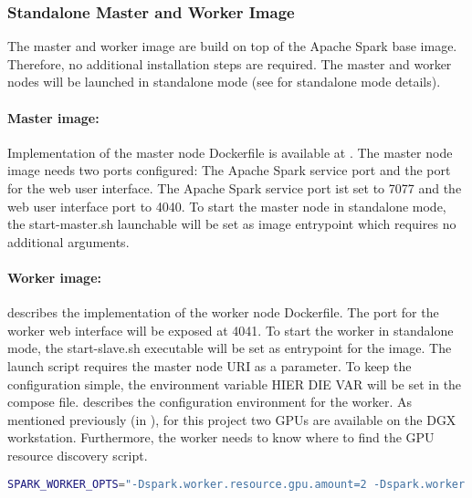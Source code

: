 \subsubsection{Standalone Master and Worker Image}
The master and worker image are build on top of the  Apache Spark base image.
Therefore, no additional installation steps are required.
The master and worker nodes will be launched in standalone mode (see  for standalone mode details).


\paragraph{Master image:}
Implementation of the master node Dockerfile is available at .
The master node image needs two ports configured: The Apache Spark service port and the port for the web user interface.
The Apache Spark service port ist set to 7077 and the web user interface port to 4040. 
To start the master node in standalone mode, the start-master.sh launchable will be set as image entrypoint which requires no additional arguments.


\paragraph{Worker image:}
 describes the implementation of the worker node Dockerfile.
The port for the worker web interface will be exposed at 4041.
To start the worker in standalone mode, the start-slave.sh executable will be set as entrypoint for the image.
The launch script requires the master node URI as a parameter. To keep the configuration simple, the environment variable HIER DIE VAR will be set in the compose file.
 describes the configuration environment for the worker. As mentioned previously (in ), for this project two GPUs are available on the DGX workstation. Furthermore, the worker needs to know where to find the GPU resource discovery script.

\begin{lstlisting}[label=lst:06_computing_spark_worker-env, caption=Environment configuration for all worker nodes, language=bash]
SPARK_WORKER_OPTS="-Dspark.worker.resource.gpu.amount=2 -Dspark.worker.resource.gpu.discoveryScript=/opt/sparkRapidsPlugin/getGpusResources.sh"
\end{lstlisting}


